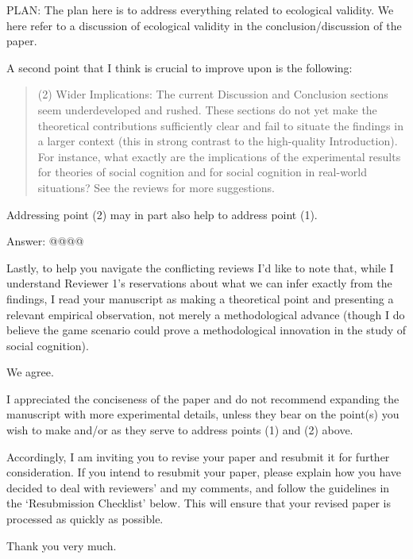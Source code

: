 \documentclass[a4paper]{article}
\newenvironment{response}{\smallskip \noindent \color{blue}}{\color{black}\smallskip}
\newenvironment{robin}{\smallskip \noindent \color{red!10!green!50!blue}}{\color{black}\smallskip}
\begin{document}
\begin{robin}
PLAN: The plan here is to address everything related to ecological validity. We here refer to a discussion of ecological validity in the conclusion/discussion of the paper. 

\end{robin} 


A second point that I think is crucial to improve upon is the following:
\begin{quote}
(2)    Wider Implications: The current Discussion and Conclusion sections seem underdeveloped and rushed. These sections do not yet make the theoretical contributions sufficiently clear and fail to situate the findings in a larger context (this in strong contrast to the high-quality Introduction). For instance, what exactly are the implications of the experimental results for theories of social cognition and for social cognition in real-world situations? See the reviews for more suggestions.
\end{quote}
Addressing point (2) may in part also help to address point (1). 


\begin{robin}Answer: @@@@
\end{robin}



Lastly, to help you navigate the conflicting reviews I’d like to note that, while I understand Reviewer 1’s reservations about what we can infer exactly from the findings, I read your manuscript as making a theoretical point and presenting a relevant empirical observation, not merely a methodological advance (though I do believe the game scenario could prove a methodological innovation in the study of social cognition). 

\begin{response}
We agree.
\end{response}

I appreciated the conciseness of the paper and do not recommend expanding the manuscript with more experimental details, unless they bear on the point(s) you wish to make and/or as they serve to address points (1) and (2) above. 

Accordingly, I am inviting you to revise your paper and resubmit it for further consideration. If you intend to resubmit your paper, please explain how you have decided to deal with reviewers’ and my comments, and follow the guidelines in the ‘Resubmission Checklist’ below. This will ensure that your revised paper is processed as quickly as possible. 

\begin{response}
Thank you very much. 
\end{response}
\end{document}
